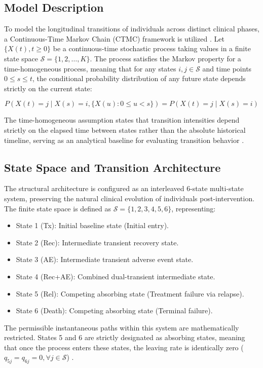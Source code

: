 \documentclass[9pt,a4paper,twocolumn,twoside]{rho-class/rho}
\begin{document}
    \subsection{Model Description}
        To model the longitudinal transitions of individuals across distinct clinical phases, a Continuous-Time Markov Chain (CTMC) framework is utilized \cite{Norris1997, Dobrow2016}. Let $\{X(t), t \geq 0\}$ be a continuous-time stochastic process taking values in a finite state space $\mathcal{S} = \{1, 2, \dots, K\}$. The process satisfies the Markov property for a time-homogeneous process, meaning that for any states $i, j \in \mathcal{S}$ and time points $0 \leq s \leq t$, the conditional probability distribution of any future state depends strictly on the current state:

        \begin{equation}
            P(X(t) = j \mid X(s) = i, \{X(u) : 0 \leq u < s\}) = P(X(t) = j \mid X(s) = i)
        \end{equation}
        
        The time-homogeneous assumption states that transition intensities depend strictly on the elapsed time between states rather than the absolute historical timeline, serving as an analytical baseline for evaluating transition behavior \cite{CoxMiller1965}.

    \subsection{State Space and Transition Architecture}
        The structural architecture is configured as an interleaved 6-state multi-state system, preserving the natural clinical evolution of individuals post-intervention. The finite state space is defined as $\mathcal{S} = \{1, 2, 3, 4, 5, 6\}$, representing:
        \begin{itemize}
            \item State 1 (Tx): Initial baseline state (Initial entry).
            \item State 2 (Rec): Intermediate transient recovery state.
            \item State 3 (AE): Intermediate transient adverse event state.
            \item State 4 (Rec+AE): Combined dual-transient intermediate state.
            \item State 5 (Rel): Competing absorbing state (Treatment failure via relapse).
            \item State 6 (Death): Competing absorbing state (Terminal failure).
        \end{itemize}
        The permissible instantaneous paths within this system are mathematically restricted. States 5 and 6 are strictly designated as absorbing states, meaning that once the process enters these states, the leaving rate is identically zero ($q_{5j} = q_{6j} = 0, \forall j \in \mathcal{S}$) \cite{AndersenKeiding2002}.
\end{document}
